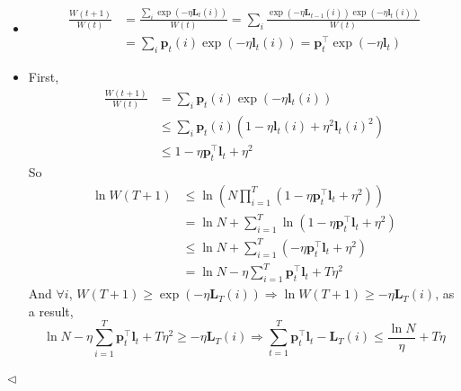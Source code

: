 \documentclass[11pt]{article}
\newenvironment{answer}[1][Answer]{\begin{trivlist}
\item[\hskip \labelsep {\bfseries #1.}\hskip \labelsep]}{\hfill$\lhd$\end{trivlist}}
\begin{document}
\begin{answer} ~
    \begin{itemize}
        \item[(1)] 
            \begin{align*}
            \frac{W(t+1)}{W(t)} &= \frac{\sum_i \exp(-\eta\bm L_t(i))}{W(t)} = \sum_i \frac{\exp(-\eta \bm L_{t-1}(i)) \exp(-\eta \bm l_t(i))}{W(t)} \\
            &= \sum_i \bm p_t(i) \exp(-\eta \bm l_t(i)) = \bm p_t^\top \exp(-\eta \bm l_t)
            \end{align*}
        \item[(2)] First, 
            \begin{align*}
            \frac{W(t+1)}{W(t)} &= \sum_i \bm p_t(i) \exp(-\eta \bm l_t(i)) \\
            &\le \sum_i \bm p_t(i) (1 - \eta \bm l_t(i) + \eta^2 \bm l_t(i)^2) \\
            &\le 1 - \eta \bm p_t^\top \bm l_t + \eta^2
            \end{align*}
            So
            \begin{align*}
            \ln W(T+1) &\le \ln \left(N \prod_{i=1}^T (1 - \eta \bm p_t^\top \bm l_t + \eta^2)\right) \\
            &= \ln N + \sum_{i=1}^T \ln (1 - \eta \bm p_t^\top \bm l_t + \eta^2) \\
            &\le \ln N + \sum_{i=1}^T (- \eta \bm p_t^\top \bm l_t + \eta^2) \\
            &= \ln N - \eta \sum_{i=1}^T \bm p_t^\top \bm l_t + T\eta^2
            \end{align*}
            And $\forall i$, $W(T+1) \ge \exp(-\eta \bm L_T(i)) \Longrightarrow \ln W(T+1) \ge -\eta \bm L_T(i)$, as a result, 
            \[\ln N - \eta \sum_{i=1}^T \bm p_t^\top \bm l_t + T\eta^2 \ge -\eta \bm L_T(i) \Longrightarrow \sum_{t=1}^T\bm{p}_t^\top\bm{l}_t-\bm L_T(i)\leq\frac{\ln N}{\eta}+T\eta\]
    \end{itemize}
\end{answer}
\end{document}
